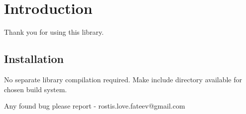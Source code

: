 \section*{Introduction}

Thank you for using this library. 

\subsection*{Installation}

No separate library compilation required. Make include directory available for chosen build system.

Any found bug please report - rostis.love.fateev@gmail.com